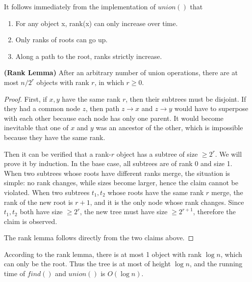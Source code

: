 It follows immediately from the implementation of $union()$ that
\begin{enumerate}
\item For any object x, rank(x) can only increase over time.
\item Only ranks of roots can go up.
\item Along a path to the root, ranks strictly increase.
\end{enumerate}
\begin{lemma}\textbf{(Rank Lemma)}
After an arbitrary number of union operations, there are at most $n/2^r$ objects with rank $r$, in which $r\geq 0$. 
\end{lemma}
\begin{proof}
First, if $x,y$ have the same rank $r$, then their subtrees must be disjoint. If they had a common node $z$, then path $z\rightarrow x$ and $z\rightarrow y$ would have to superpose with each other because each node has only one parent. It would become inevitable that one of $x$ and $y$ was an ancestor of the other, which is impossible because they have the same rank. 

Then it can be verified that a rank-$r$ object has a subtree of size $\geq 2^r$. We will prove it by induction. In the base case, all subtrees are of rank $0$ and size 1. When two subtrees whose roots have different ranks merge, the situation is simple: no rank changes, while sizes become larger, hence the claim cannot be violated. When two subtrees $t_1, t_2$ whose roots have the same rank $r$ merge, the rank of the new root is $r+1$, and it is the only node whose rank changes. Since $t_1,t_2$ both have size $\geq 2^r$, the new tree must have size $\geq 2^{r+1}$, therefore the claim is observed. 

The rank lemma follows directly from the two claims above.    
\end{proof}
According to the rank lemma, there is at most 1 object with rank $\log n$, which can only be the root. Thus the tree is at most of height $\log n$, and the running time of $find()$ and $union()$ is $O(\log n)$. 
